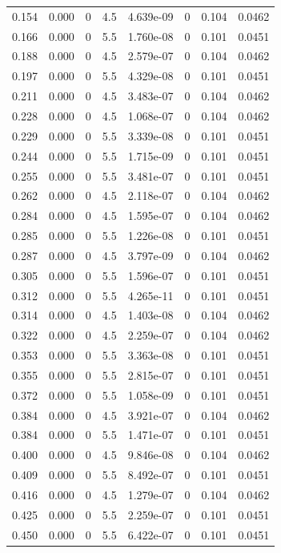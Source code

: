 \documentclass[preview]{standalone}
\begin{document}
{{\begin{tabular}{L{1.2cm}C{1.2cm} C{0.3cm}C{0.5cm} C{1.4cm}C{1.4cm} C{1.4cm}C{1.4cm}}
  0.154  &  0.000  & 0     & 4.5 &  4.639e-09  & 0  & 0.104 &  0.0462   \\ 
  0.166  &  0.000  & 0     & 5.5 &  1.760e-08  & 0  & 0.101 &  0.0451   \\ 
  0.188  &  0.000  & 0     & 4.5 &  2.579e-07  & 0  & 0.104 &  0.0462   \\ 
  0.197  &  0.000  & 0     & 5.5 &  4.329e-08  & 0  & 0.101 &  0.0451   \\ 
  0.211  &  0.000  & 0     & 4.5 &  3.483e-07  & 0  & 0.104 &  0.0462   \\ 
  0.228  &  0.000  & 0     & 4.5 &  1.068e-07  & 0  & 0.104 &  0.0462   \\ 
  0.229  &  0.000  & 0     & 5.5 &  3.339e-08  & 0  & 0.101 &  0.0451   \\ 
  0.244  &  0.000  & 0     & 5.5 &  1.715e-09  & 0  & 0.101 &  0.0451   \\ 
  0.255  &  0.000  & 0     & 5.5 &  3.481e-07  & 0  & 0.101 &  0.0451   \\ 
  0.262  &  0.000  & 0     & 4.5 &  2.118e-07  & 0  & 0.104 &  0.0462   \\ 
  0.284  &  0.000  & 0     & 4.5 &  1.595e-07  & 0  & 0.104 &  0.0462   \\ 
  0.285  &  0.000  & 0     & 5.5 &  1.226e-08  & 0  & 0.101 &  0.0451   \\ 
  0.287  &  0.000  & 0     & 4.5 &  3.797e-09  & 0  & 0.104 &  0.0462   \\ 
  0.305  &  0.000  & 0     & 5.5 &  1.596e-07  & 0  & 0.101 &  0.0451   \\ 
  0.312  &  0.000  & 0     & 5.5 &  4.265e-11  & 0  & 0.101 &  0.0451   \\ 
  0.314  &  0.000  & 0     & 4.5 &  1.403e-08  & 0  & 0.104 &  0.0462   \\ 
  0.322  &  0.000  & 0     & 4.5 &  2.259e-07  & 0  & 0.104 &  0.0462   \\ 
  0.353  &  0.000  & 0     & 5.5 &  3.363e-08  & 0  & 0.101 &  0.0451   \\ 
  0.355  &  0.000  & 0     & 5.5 &  2.815e-07  & 0  & 0.101 &  0.0451   \\ 
  0.372  &  0.000  & 0     & 5.5 &  1.058e-09  & 0  & 0.101 &  0.0451   \\ 
  0.384  &  0.000  & 0     & 4.5 &  3.921e-07  & 0  & 0.104 &  0.0462   \\ 
  0.384  &  0.000  & 0     & 5.5 &  1.471e-07  & 0  & 0.101 &  0.0451   \\ 
  0.400  &  0.000  & 0     & 4.5 &  9.846e-08  & 0  & 0.104 &  0.0462   \\ 
  0.409  &  0.000  & 0     & 5.5 &  8.492e-07  & 0  & 0.101 &  0.0451   \\ 
  0.416  &  0.000  & 0     & 4.5 &  1.279e-07  & 0  & 0.104 &  0.0462   \\ 
  0.425  &  0.000  & 0     & 5.5 &  2.259e-07  & 0  & 0.101 &  0.0451   \\ 
  0.450  &  0.000  & 0     & 5.5 &  6.422e-07  & 0  & 0.101 &  0.0451   \\ 
\hline 
\end{tabular} 

}}
\end{document}
